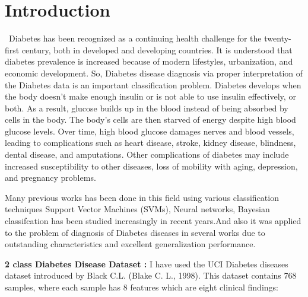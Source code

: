  
\pagestyle{empty} %

\titleGP %
\newpage

\section{Introduction}
   \    Diabetes has been recognized as a continuing health challenge for the twenty-first century, both in developed and developing countries. It is understood that diabetes prevalence is increased because of modern lifestyles, urbanization, and economic development.
   So, Diabetes disease diagnosis via proper interpretation of the Diabetes data is an important classification problem. 
Diabetes develops when the body doesn’t make enough insulin or is not able to use insulin effectively, or both. As a result, glucose builds up in the blood instead of being absorbed by cells in the body. The body’s cells are then starved of energy despite high blood glucose levels.
Over time, high blood glucose damages nerves and blood vessels, leading to complications such as heart disease, stroke, kidney disease, blindness, dental disease, and amputations. Other complications of diabetes may include increased susceptibility to other diseases, loss of mobility with aging, depression, and pregnancy problems.

Many previous works has been done in this field using various classification techniques Support Vector Machines (SVMs), Neural networks, Bayesian classifcation has been studied increasingly in recent years.And also it was applied to the problem of diagnosis of Diabetes diseases in several works due to outstanding characteristics and excellent generalization performance.
 
\textbf{2 class Diabetes Disease Dataset :}
I have used the UCI Diabetes diseases dataset introduced by Black C.L. (Blake C. L., 1998). This dataset contains 768 samples, where each sample has 8 features which are eight clinical findings:


